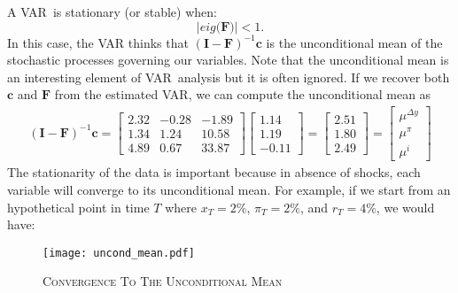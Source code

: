 \documentclass[11pt,a4paper]{report}
\numberwithin{equation}{chapter}
\numberwithin{section}{chapter}
\begin{document}
\noindent A VAR\ is stationary (or stable) when: 
\begin{equation*}
\left\vert eig(\mathbf{F)}\right\vert <1.
\end{equation*}%
In this case, the VAR thinks that $(\mathbf{I}-\mathbf{F})^{-1}\mathbf{c}$
is the unconditional mean of the stochastic processes governing our
variables. Note that the unconditional mean is an interesting element of
VAR\ analysis but it is often ignored. If we recover both $\mathbf{c}$ and $%
\mathbf{F}$ from the estimated VAR, we can compute the unconditional mean as 
\begin{equation*}
\begin{array}{c}
\mathbf{(I-\mathbf{F})}^{-1}\mathbf{c}=\left[ 
\begin{array}{ccc}
2.32 & -0.28 & -1.89 \\ 
1.34 & 1.24 & 10.58 \\ 
4.89 & 0.67 & 33.87%
\end{array}%
\right] \left[ 
\begin{array}{c}
1.14 \\ 
1.19 \\ 
-0.11%
\end{array}%
\right] =\left[ 
\begin{array}{c}
2.51 \\ 
1.80 \\ 
2.49%
\end{array}%
\right] =\left[ 
\begin{array}{l}
\mu ^{\Delta y} \\ 
\mu ^{\pi } \\ 
\mu ^{i}%
\end{array}%
\right]%
\end{array}%
\end{equation*}%
The stationarity of the data is important because in absence of shocks, each
variable will converge to its unconditional mean. For example, if we start
from an hypothetical point in time $T$ where $x_{T}=2\%$, $\pi _{T}=2\%$,
and $r_{T}=4\%$, we would have:

\begin{figure}[!ht]\vspace{.1cm}
\centering
\begin{minipage}[b]{0.79\textwidth}%
\texttt{[image: uncond\_mean.pdf]}
\vspace{.3cm}%
\caption{ {\scshape Convergence To The Unconditional Mean}}\label{fig:}%
\end{minipage}
\end{figure}%
\end{document}

